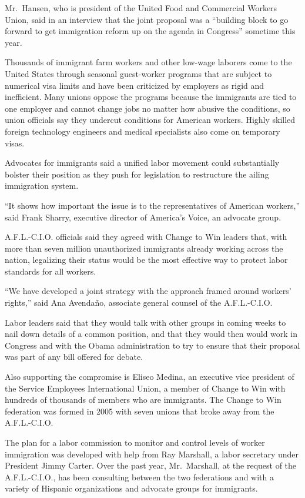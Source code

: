 \documentclass[12pt,a4paper,onecolumn]{article}
\begin{document}
Mr.~Hansen, who is president of the United Food and Commercial Workers Union, said in an interview
that the joint proposal was a ``building block to go forward to get immigration reform up on the
agenda in Congress'' sometime this year.

Thousands of immigrant farm workers and other low-wage laborers come to the United States through
seasonal guest-worker programs that are subject to numerical visa limits and have been criticized by
employers as rigid and inefficient. Many unions oppose the programs because the immigrants are tied
to one employer and cannot change jobs no matter how abusive the conditions, so union officials say
they undercut conditions for American workers. Highly skilled foreign technology engineers and
medical specialists also come on temporary visas.

Advocates for immigrants said a unified labor movement could substantially bolster their position as
they push for legislation to restructure the ailing immigration system.

``It shows how important the issue is to the representatives of American workers,'' said Frank
Sharry, executive director of America's Voice, an advocate group.

A.F.L.-C.I.O. officials said they agreed with Change to Win leaders that, with more than seven
million unauthorized immigrants already working across the nation, legalizing their status would be
the most effective way to protect labor standards for all workers.

``We have developed a joint strategy with the approach framed around workers' rights,'' said Ana
Avenda\~{n}o, associate general counsel of the A.F.L.-C.I.O.

Labor leaders said that they would talk with other groups in coming weeks to nail down details of a
common position, and that they would then would work in Congress and with the Obama administration
to try to ensure that their proposal was part of any bill offered for debate.

Also supporting the compromise is Eliseo Medina, an executive vice president of the Service
Employees International Union, a member of Change to Win with hundreds of thousands of members who
are immigrants. The Change to Win federation was formed in 2005 with seven unions that broke away
from the A.F.L.-C.I.O.

The plan for a labor commission to monitor and control levels of worker immigration was developed
with help from Ray Marshall, a labor secretary under President Jimmy Carter. Over the past year,
Mr.~Marshall, at the request of the A.F.L.-C.I.O., has been consulting between the two federations
and with a variety of Hispanic organizations and advocate groups for immigrants.
\end{document}
